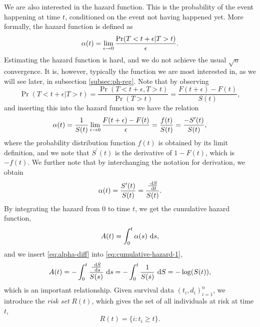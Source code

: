 We are also interested in the hazard function. This is the probability of the event happening at time $t$, conditioned on the event not having happened yet. More formally, the hazard function is defined as
\begin{equation*}
    \alpha(t)=\lim_{\epsilon\to0}\frac{\Pr(T<t+\epsilon|T>t)}{\epsilon}.
\end{equation*}
Estimating the hazard function is hard, and we do not achieve the usual $\sqrt{n}$ convergence.
It is, however, typically the function we are most interested in, as we will see later, in subsection \ref{subsec:ph-reg}.
Note that by observing
\begin{equation*}
    \Pr(T<t+\epsilon|T>t)=\frac{\Pr(T<t+\epsilon,T>t)}{\Pr(T>t)}=\frac{F(t+\epsilon)-F(t)}{S(t)},
\end{equation*}
and inserting this into the hazard function we have the relation
\begin{equation}
\label{eq:hfs}
    \alpha(t)=\frac{1}{S(t)}\lim_{\epsilon\to0}\frac{F(t+\epsilon)-F(t)}{\epsilon}=\frac{f(t)}{S(t)}=\frac{-S^\prime(t)}{S(t)},
\end{equation}
where the probability distribution function $f(t)$ is obtained by its limit definition, and we note that $S^\prime(t)$ is the derivative of $1-F(t)$, which is $-f(t)$. We further note that by interchanging the notation for derivation, we obtain
\begin{equation}\label{eq:alpha-diff}
\alpha(t)=\frac{S^{\prime}(t)}{S(t)}=\frac{\frac{~\text{d} S}{~\text{d} t}}{S(t)}.
\end{equation}
By integrating the hazard from 0 to time $t$, we get the cumulative hazard function,
\begin{equation}\label{eq:cumulative-hazard-1}
    A(t)=\int_0^t\alpha(s)~\text{d} s,
\end{equation}
and we insert \eqref{eq:alpha-diff} into \eqref{eq:cumulative-hazard-1},
\begin{equation}\label{eq:cumulative-hazard}
\begin{split}
     A(t)=-\int_0^t\frac{\frac{~\text{d} S}{~\text{d} s}}{S(s)}~\text{d} s=-\int_0^t\frac{1}{S(s)}~\text{d} S=-\log(S(t)),
\end{split}
\end{equation}
which is an important relationship.
Given survival data $(t_i,d_i)_{i=1}^n$, we introduce the \textit{risk set} $R(t)$, which gives the set of all individuals at risk at time $t$,
\begin{equation*}
    R(t)=\{i\colon t_i\geq t\}.
\end{equation*}
